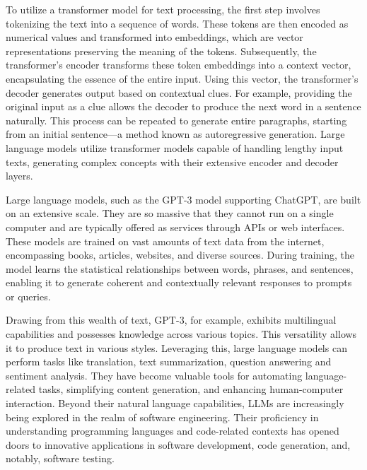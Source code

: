 To utilize a transformer model for text processing, the first step involves tokenizing the text into a sequence of words\cite{}. These tokens are then encoded as numerical values and transformed into embeddings, which are vector representations preserving the meaning of the tokens. Subsequently, the transformer's encoder transforms these token embeddings into a context vector, encapsulating the essence of the entire input. Using this vector, the transformer's decoder generates output based on contextual clues. For example, providing the original input as a clue allows the decoder to produce the next word in a sentence naturally. This process can be repeated to generate entire paragraphs, starting from an initial sentence—a method known as autoregressive generation\cite{}. Large language models utilize transformer models capable of handling lengthy input texts, generating complex concepts with their extensive encoder and decoder layers.

Large language models, such as the GPT-3 model supporting ChatGPT, are built on an extensive scale. They are so massive that they cannot run on a single computer and are typically offered as services through APIs or web interfaces. These models are trained on vast amounts of text data from the internet, encompassing books, articles, websites, and diverse sources\cite{}. During training, the model learns the statistical relationships between words, phrases, and sentences, enabling it to generate coherent and contextually relevant responses to prompts or queries.

Drawing from this wealth of text, GPT-3, for example, exhibits multilingual capabilities and possesses knowledge across various topics. This versatility allows it to produce text in various styles. Leveraging this, large language models can perform tasks like translation, text summarization, question answering and sentiment analysis\cite{}. They have become valuable tools for automating language-related tasks, simplifying content generation, and enhancing human-computer interaction. Beyond their natural language capabilities, LLMs are increasingly being explored in the realm of software engineering. Their proficiency in understanding programming languages and code-related contexts has opened doors to innovative applications in software development, code generation, and, notably, software testing\cite{}.

